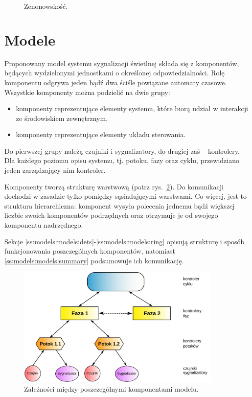 \documentclass{pracamgr}
\newcommand{\imgr}[1]{rys.~\ref{#1}}
\theoremstyle{plain}
\begin{document}
\begin{figure}
  \centering
  \hspace{1in}
  \caption{Zenonowskość.}
  \label{img:models-zeno}
\end{figure}

\section{Modele}
\label{s:models:models}
Proponowany model systemu sygnalizacji świetlnej składa się z
komponentów, będących wydzielonymi jednostkami o określonej
odpowiedzialności. Rolę komponentu odgrywa jeden bądź dwa ściśle
powiązane automaty czasowe. Wszystkie komponenty można podzielić na
dwie grupy:
\begin{itemize}
  \item komponenty reprezentujące elementy systemu, które biorą udział
  w interakcji ze środowiskiem zewnętrznym,
  \item komponenty reprezentujące elementy układu sterowania.
\end{itemize}
Do pierwszej grupy należą czujniki i sygnalizatory, do drugiej zaś --
kontrolery. Dla każdego poziomu opisu systemu, tj. potoku, fazy oraz
cyklu, przewidziano jeden zarządzający nim kontroler.

Komponenty tworzą strukturę warstwową (patrz \imgr{img:hierarchy}). Do
komunikacji dochodzi w zasadzie tylko pomiędzy sąsiadującymi
warstwami. Co więcej, jest to struktura hierarchiczna: komponent
wysyła polecenia jednemu bądź większej liczbie swoich komponentów
podrzędnych oraz otrzymuje je od swojego komponentu nadrzędnego.

Sekcje \ref{ss:models:models:dets}-\ref{ss:models:models:ring}
opisują strukturę i sposób funkcjonowania poszczególnych komponentów,
natomiast \ref{ss:models:models:summary} podsumowuje ich komunikację.

\begin{figure}[h]
  \centering
  \includegraphics[width=0.9\textwidth]{img/models-hierarchy}
  \caption{Zależności między poszczególnymi komponentami modelu.}
  \label{img:hierarchy}
\end{figure}
\end{document}
